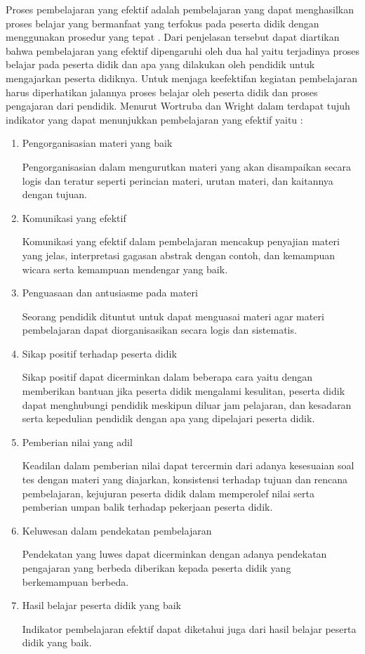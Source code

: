 	Proses pembelajaran yang efektif adalah pembelajaran yang dapat menghasilkan proses belajar yang bermanfaat yang terfokus pada peserta didik dengan menggunakan prosedur yang tepat \citep{Uno2017}. Dari penjelasan tersebut dapat diartikan bahwa pembelajaran yang efektif dipengaruhi oleh dua hal yaitu terjadinya proses belajar pada peserta didik dan apa yang dilakukan oleh pendidik untuk mengajarkan peserta didiknya. Untuk menjaga keefektifan kegiatan pembelajaran harus diperhatikan jalannya proses belajar oleh peserta didik dan proses pengajaran dari pendidik. Menurut Wortruba dan Wright dalam \cite{Uno2017} terdapat tujuh indikator yang dapat menunjukkan pembelajaran yang efektif yaitu :

\begin{enumerate}
	\item Pengorganisasian materi yang baik
	
	Pengorganisasian dalam mengurutkan materi yang akan disampaikan secara logis dan teratur seperti perincian materi, urutan materi, dan kaitannya dengan tujuan.

	\item Komunikasi yang efektif

	Komunikasi yang efektif dalam pembelajaran mencakup penyajian materi yang jelas, interpretasi gagasan abstrak dengan contoh, dan kemampuan wicara serta kemampuan mendengar yang baik.

	\item Penguasaan dan antusiasme pada materi
	
	Seorang pendidik dituntut untuk dapat menguasai materi agar materi pembelajaran dapat diorganisasikan secara logis dan sistematis.

	\item Sikap positif terhadap peserta didik

	Sikap positif dapat dicerminkan dalam beberapa cara yaitu dengan memberikan bantuan jika peserta didik mengalami kesulitan, peserta didik dapat menghubungi pendidik meskipun diluar jam pelajaran, dan kesadaran serta kepedulian pendidik dengan apa yang dipelajari peserta didik.

	\item Pemberian nilai yang adil
	
	Keadilan dalam pemberian nilai dapat tercermin dari adanya kesesuaian soal tes dengan materi yang diajarkan, konsistensi terhadap tujuan dan rencana pembelajaran, kejujuran peserta didik dalam memperolef nilai serta pemberian umpan balik terhadap pekerjaan peserta didik.

	\item Keluwesan dalam pendekatan pembelajaran
		
	Pendekatan yang luwes dapat dicerminkan dengan adanya pendekatan pengajaran yang berbeda diberikan kepada peserta didik yang berkemampuan berbeda.

	\item Hasil belajar peserta didik yang baik

	Indikator pembelajaran efektif dapat diketahui juga dari hasil belajar peserta didik yang baik.
\end{enumerate}
	

